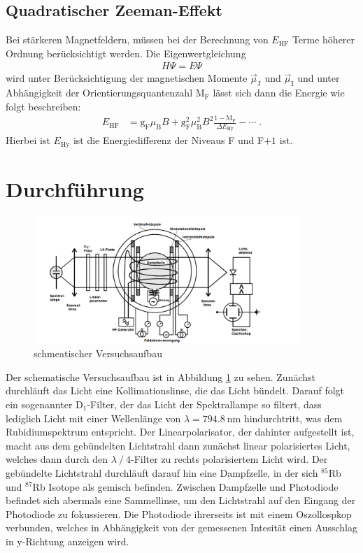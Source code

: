 \subsection{Quadratischer Zeeman-Effekt}
Bei stärkeren Magnetfeldern, müssen bei der Berechnung von $E_{\text{HF}}$ Terme höherer Ordnung berücksichtigt werden.
Die Eigenwertgleichung
\begin{align*}
    H \Psi = E \Psi
\end{align*}
wird unter Berücksichtigung der magnetischen Momente $\vec{\mu}_{\text{J}}$ und $\vec{\mu}_{\text{I}}$ und unter Abhängigkeit der Orientierungsquantenzahl $\text{M}_{\text{F}}$ lässt sich dann die Energie wie folgt beschreiben:
\begin{align}
  \label{eq_qZeeman}
    E_{\text{HF}} &= \text{g}_{\text{F}} \mu_{\text{B}} B+ \text{g}_{\text{F}}^2 \mu_{\text{B}}^2 B^2 \frac{1- \text{M}_{\text{F}}}{\Delta E_{\text{Hy}}}- \cdots  \; .
\end{align}
Hierbei ist $E_{\text{Hy}}$ ist die Energiedifferenz der Niveaus F und F$+1$ ist.

\section{Durchführung}
\FloatBarrier
\begin{figure}
    \centering
    \includegraphics[width=0.9\textwidth]{Aufbau.PNG}
    \caption{schmeatischer Versuchsaufbau}
    \label{abb:Aufbau}
\end{figure}
\FloatBarrier
Der schematische Versuchsaufbau ist in Abbildung \ref{abb:Aufbau} zu sehen.
Zunächst durchläuft das Licht eine Kollimationslinse, die das Licht bündelt. Darauf folgt
ein sogenannter $\text{D}_1$-Filter, der das Licht der Spektrallampe so filtert, dass
lediglich Licht mit einer Wellenlänge von $\lambda = \SI{794,8}{\nano\meter}$ hindurchtritt, was dem Rubidiumspektrum entspricht.
Der Linearpolarisator, der dahinter aufgestellt ist, macht aus dem gebündelten
Lichtstrahl dann zunächst linear polarisiertes Licht, welches dann durch den $\lambda\:/\:4$-Filter zu rechts polarisiertem Licht wird.
Der gebündelte Lichtstrahl durchläuft darauf hin eine Dampfzelle, in der sich $^{85}$Rb
und $^{87}$Rb Isotope als gemisch befinden. Zwischen Dampfzelle und Photodiode befindet
sich abermals eine Sammellinse, um den Lichtstrahl auf den Eingang der Photodiode zu fokussieren. Die Photodiode ihrerseits ist mit einem Oszollospkop verbunden, welches in
Abhängigkeit von der gemessenen Intesität einen Ausschlag in y-Richtung anzeigen wird.

